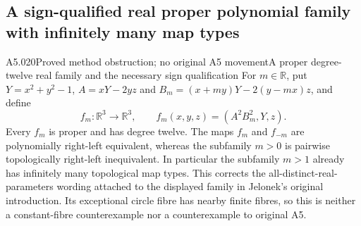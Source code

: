 \subsection{A sign-qualified real proper polynomial family with infinitely many map types}

\begin{saresult}{A5.020}{Proved method obstruction; no original A5 movement}{A proper degree-twelve real family and the necessary sign qualification}
For $m\in\mathbb R$, put $Y=x^2+y^2-1$, $A=xY-2yz$ and
$B_m=(x+my)Y-2(y-mx)z$, and define
\[
 f_m:\mathbb R^3\longrightarrow\mathbb R^3,
 \qquad f_m(x,y,z)=(A^2B_m^2,Y,z).
\]
Every $f_m$ is proper and has degree twelve. The maps $f_m$ and $f_{-m}$
are polynomially right-left equivalent, whereas the subfamily $m>0$
is pairwise topologically right-left inequivalent. In particular the
subfamily $m>1$ already has infinitely many topological map types.
This corrects the all-distinct-real-parameters wording attached to the
displayed family in Jelonek's original introduction. Its exceptional
circle fibre has nearby finite fibres, so this is neither a constant-fibre
counterexample nor a counterexample to original A5.
\end{saresult}

